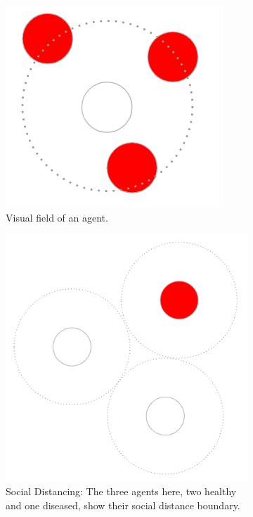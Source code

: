 \documentclass[a4paper,11pt]{article}
\begin{document}
    \begin{figure}[ht]
        \centering
        \begin{subfigure}[b]{0.2\linewidth}
            \includegraphics[width=\linewidth]{diagrams/visual_field.PNG}
            \caption{Visual field of an agent.}
            \label{fig:3.1a}
        \end{subfigure}
        \begin{subfigure}[b]{0.3\linewidth}
            \includegraphics[width=\linewidth]{diagrams/social_distancing.PNG}
            \caption{Social Distancing: The three agents here, two healthy and one diseased, show their social distance boundary.}
            \label{fig:3.1b}
        \end{subfigure}
        \caption{}
    \end{figure}
\end{document}
